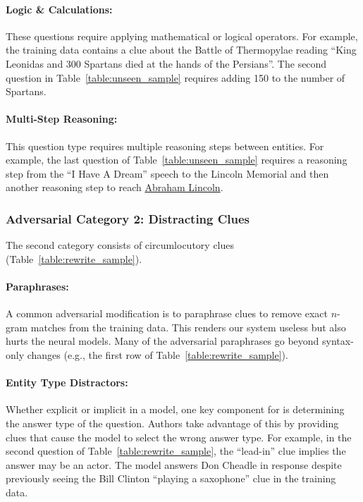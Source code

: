 \paragraph{Logic \& Calculations:} These questions require applying mathematical
or logical operators. For example, the training data
contains a clue about the Battle of Thermopylae reading ``King
Leonidas and 300 Spartans died at the hands of the Persians''. The
second question in Table~\ref{table:unseen_sample} requires adding
150 to the number of Spartans.~\smallskip 

\paragraph{Multi-Step Reasoning:} This question type requires multiple reasoning
steps between entities. For example, the last question of
Table~\ref{table:unseen_sample} requires a reasoning step
from the ``I Have A Dream'' speech to the Lincoln Memorial and then 	another
reasoning step to reach \underline{Abraham Lincoln}. 

\subsubsection{Adversarial Category 2: Distracting Clues}
\label{sec:changes_language}

The second category consists of circumlocutory clues (Table~\ref{table:rewrite_sample}).~\smallskip

\paragraph{Paraphrases:} A common adversarial modification is to
paraphrase clues to remove exact $n$-gram matches from the training data. This
renders our  system useless but also hurts the neural models. Many of
the adversarial paraphrases go beyond syntax-only changes (e.g., the first row of Table~\ref{table:rewrite_sample}).~\smallskip

\paragraph{Entity Type Distractors:} Whether explicit or implicit in a model, one key component for  is determining the
answer type of the question. Authors take advantage of this
by providing clues that cause the model to select the wrong answer type. For example,
in the second question of Table~\ref{table:rewrite_sample}, the ``lead-in'' clue implies
the answer may be an actor. The  model answers Don Cheadle in response despite previously
seeing the Bill Clinton ``playing a saxophone'' clue in the training data.~\smallskip

